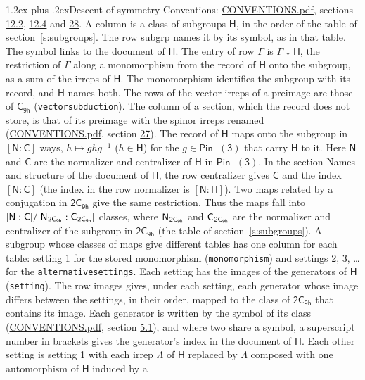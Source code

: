 \documentclass[10pt,a4paper]{article}
\makeatletter
\renewcommand\section{\@startsection{section}{1}{\z@}{-3ex plus -1ex minus -.2ex}%
  {1.2ex plus .2ex}{\normalfont\large\sffamily\bfseries\color{parttitle}}}
\numberwithin{equation}{section}
\newcommand{\grp}[1]{\mathsf{#1}}
\newcommand{\grpindex}[2]{[#1 : #2]}
\newcommand{\restr}[2]{#1\!\downarrow#2}
\newcommand{\hairsp}{\mkern1mu}
\makeatother
\begin{document}
\section{Descent of symmetry}\label{s:subduction}
Conventions: \href{../../CONVENTIONS.pdf}{CONVENTIONS.pdf}, sections \href{../../../rotation/CONVENTIONS.pdf\#conv.12.2}{12.2}, \href{../../../rotation/CONVENTIONS.pdf\#conv.12.4}{12.4} and \href{../../CONVENTIONS.pdf\#conv.28}{28}.
A column is a class of subgroups $\grp{H}$, in the order of the table of section~\ref{s:subgroups}. The row subgrp names it by its symbol, as in that table. The symbol links to the document of $\grp{H}$. The entry of row $\Gamma$ is $\restr{\Gamma}{\grp{H}}$, the restriction of $\Gamma$ along a monomorphism from the record of $\grp{H}$ onto the subgroup, as a sum of the irreps of $\grp{H}$. The monomorphism identifies the subgroup with its record, and $\grp{H}$ names both. The rows of the vector irreps of a preimage are those of \href{../../../rotation/data/pdf/C9h.pdf}{$\grp{C_{9h}}$} (\texttt{vectorsubduction}). The column of a section, which the record does not store, is that of its preimage with the spinor irreps renamed (\href{../../CONVENTIONS.pdf}{CONVENTIONS.pdf}, section \href{../../CONVENTIONS.pdf\#conv.27}{27}). \label{n:group.normalizer.o3}\label{n:group.centralizer.o3}\label{n:element.h}The record of $\grp{H}$ maps onto the subgroup in $\grpindex{\grp{N}}{\grp{C}}$ ways, $h \mapsto g h g^{-1}$ ($h \in \grp{H}$) for the $g \in \grp{Pin^{-}(3)}$ that carry $\grp{H}$ to it. Here $\grp{N}$ and $\grp{C}$ are the normalizer and centralizer of $\grp{H}$ in \href{Pinminus3.pdf}{$\grp{Pin^{-}(3)}$}. In the section Names and structure of the document of $\grp{H}$, the row centralizer gives $\grp{C}$ and the index $\grpindex{\grp{N}}{\grp{C}}$ (the index in the row normalizer is $\grpindex{\grp{N}}{\grp{H}}$). Two maps related by a conjugation in $\grp{2C_{9h}}$ give the same restriction. Thus the maps fall into $\grpindex{\grp{N}}{\grp{C}}/\grpindex{\grp{N}_{\hairsp \grp{2C_{9h}}}}{\grp{C}_{\hairsp \grp{2C_{9h}}}}$ classes, where $\grp{N}_{\hairsp \grp{2C_{9h}}}$ and $\grp{C}_{\hairsp \grp{2C_{9h}}}$ are the normalizer and centralizer of the subgroup in $\grp{2C_{9h}}$ (the table of section~\ref{s:subgroups}). \label{n:head.setting}A subgroup whose classes of maps give different tables has one column for each table: setting 1 for the stored monomorphism (\texttt{monomorphism}) and settings 2, 3, \dots{} for the \texttt{alternativesettings}. Each setting has the images of the generators of $\grp{H}$ (\texttt{setting}). \label{n:head.images}The row images gives, under each setting, each generator whose image differs between the settings, in their order, mapped to the class of $\grp{2C_{9h}}$ that contains its image. Each generator is written by the symbol of its class (\href{../../CONVENTIONS.pdf}{CONVENTIONS.pdf}, section \href{../../../rotation/CONVENTIONS.pdf\#conv.5.1}{5.1}), and where two share a symbol, a superscript number in brackets gives the generator's index in the document of $\grp{H}$. \label{n:irrep.Delta}Each other setting is setting 1 with each irrep $\Lambda$ of $\grp{H}$ replaced by $\Lambda$ composed with one automorphism of $\grp{H}$ induced by a 
\end{document}
